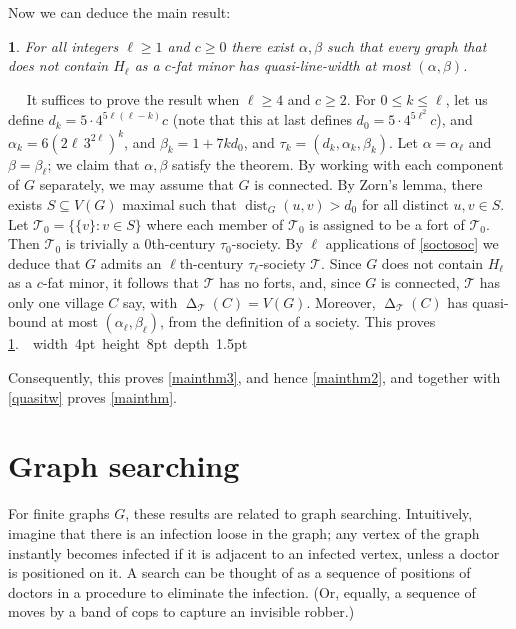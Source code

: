 \documentclass[titlepage,11pt]{article}
\newcommand\blackslug{\hbox{\hskip 1pt \vrule width 4pt height 8pt depth 1.5pt
		\hskip 1pt}}
\newcommand\bbox{\hfill \quad \blackslug \bigbreak}
\newcommand{\dist}{\operatorname{dist}}
\newcommand{\voro}{\operatorname{\Delta}}
\newcommand{\mac}{\mathcal}
\newtheorem{thm}{}[section]
\newcommand{\Proof}{\noindent{\bf Proof.}\ \ }
\begin{document}
	
	Now we can deduce the main result:
	\begin{thm}\label{mainthm4}
		For all integers $\ell\ge 1$ and $c\ge 0$
		there exist $\alpha,\beta$ such that every graph
		that does not contain $H_\ell$ as a $c$-fat minor has quasi-line-width at most $(\alpha,\beta)$.
	\end{thm}
	\Proof
	It suffices to prove the result when $\ell\ge 4$ and $c\ge 2$. 
	For $0\le k\le \ell$, let us define $d_k = 5\cdot 4^{5\ell(\ell-k)}c$ (note that this at last defines $d_0=5\cdot 4^{5\ell^2}c$), 
	and $\alpha_k= 6(2\ell\,3^{2\ell})^k$, and $\beta_k= 1+7kd_0$, and $\tau_k = (d_k, \alpha_k, \beta_k)$.
	Let $\alpha = \alpha_\ell$ and $\beta = \beta_\ell$; we claim that $\alpha, \beta$ satisfy the theorem. 
	By working with each component of $G$ separately, we may assume that $G$ is connected.
	By Zorn's lemma, there exists $S\subseteq V(G)$ maximal such that $\dist_G(u,v)> d_0$ for all distinct $u,v\in S$.
	Let $\mac T_0 = \{\{v\}:v\in S\}$ where each member of $\mac T_0$ is assigned to be a fort of $\mac T_0$.
	Then $\mathcal{T}_0$ is trivially a $0$th-century $\tau_0$-society. By $\ell$ applications of \ref{soctosoc} we deduce that 
	$G$ admits an $\ell$th-century $\tau_\ell$-society $\mac T$. Since $G$ does not contain $H_\ell$ as a $c$-fat minor, it follows that 
	$\mac T$ has no forts, and, since $G$ is connected, $\mac T$ has only one village $C$ say, with $\voro_{\mac T}(C)=V(G)$.
	Moreover, $\voro_{\mac T}(C)$ has quasi-bound at most $(\alpha_\ell,\beta_\ell)$, from the definition of a society.
	This proves \ref{mainthm4}.~\bbox
	
	Consequently, this proves \ref{mainthm3}, and hence \ref{mainthm2}, and together with \ref{quasitw} proves \ref{mainthm}.
	
	\section{Graph searching}
	
	For finite graphs $G$, these results are related to graph searching. 
	Intuitively, imagine that there is an infection loose in the graph; any vertex of the graph instantly becomes infected if it is
	adjacent to an infected vertex, unless a doctor is positioned on it. A search can be thought of as a sequence of
	positions of doctors in a procedure to eliminate the infection.  (Or, equally, a sequence of moves by a band of cops to capture an invisible robber.) 
	
\end{document}
